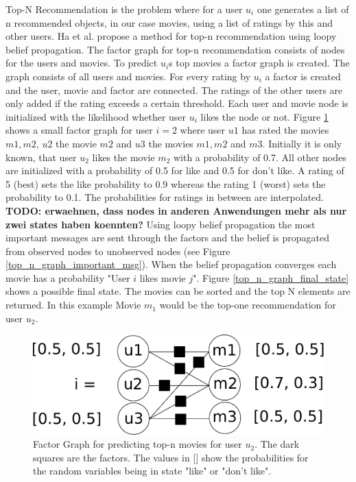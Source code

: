Top-N Recommendation is the problem where for a user $u_i$ one generates a list of n recommended objects, in our case movies, using a list of ratings by this and other users. Ha et al. \cite{Ha:2012:TRT:2396761.2398636} propose a method for top-n recommendation using loopy belief propagation. The factor graph for top-n recommendation consists of nodes for the users and movies. To predict $u_i$s top movies a factor graph is created. The graph consists of all users and movies. For every rating by $u_i$ a factor is created and the user, movie and factor are connected. The ratings of the other users are only added if the rating exceeds a certain threshold. Each user and movie node is initialized with the likelihood whether user $u_i$ likes the node or not. Figure \ref{top_n_graph} shows a small factor graph for user $i=2$ where user $u1$ has rated the movies $m1,m2$, $u2$ the movie $m2$ and $u3$ the movies $m1,m2$ and $m3$. Initially it is only known, that user $u_2$ likes the movie $m_2$ with a probability of 0.7. All other nodes are initialized with a probability of 0.5 for like and 0.5 for don't like. A rating of 5 (best) sets the like probability to 0.9 whereas the rating 1 (worst) sets the probability to 0.1. The probabilities for ratings in between are interpolated. \textbf{TODO: erwaehnen, dass nodes in anderen Anwendungen mehr als nur zwei states haben koennten?}
Using loopy belief propagation the most important messages are sent through the factors and the belief is propagated from observed nodes to unobserved nodes (see Figure \ref{top_n_graph_important_msg}). When the belief propagation converges each movie has a probability "User $i$ likes movie $j$". Figure \ref{top_n_graph_final_state} shows a possible final state. The movies can be sorted and the top N elements are returned. In this example Movie $m_1$ would be the top-one recommendation for user $u_2$.

\begin{figure}[h]\centering
    \includegraphics[scale=0.33]{graphics/top-n-graph.pdf}
  \caption{Factor Graph for predicting top-n movies for user $u_2$. The dark squares are the factors. The values in [] show the probabilities for the random variables being in state "like" or "don't like".\label{top_n_graph}}
\end{figure}

